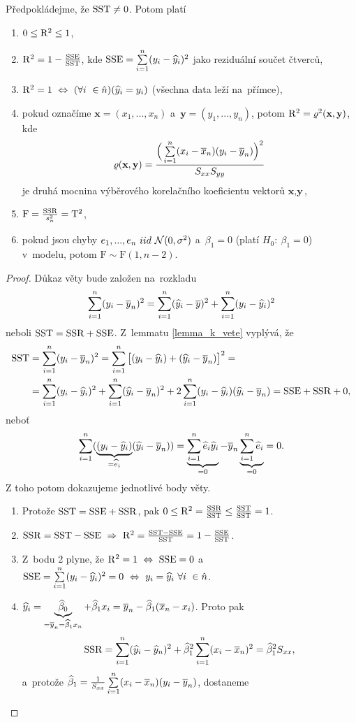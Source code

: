 \begin{theorem}
	Předpokládejme, že $\mathrm{SST}\neq 0$. Potom platí\begin{enumerate}
		\item $0\leq \mathrm{R}^2\leq1$,
		\item $\mathrm{R}^2=1-\frac{\mathrm{SSE}}{\mathrm{SST}}$, kde $\mathrm{SSE}=\sum\limits_{i=1}^{n}(y_i-\widehat{y}_i)^2$ jako reziduální součet čtverců,
		\item $\mathrm{R}^2=1~\Leftrightarrow~(\forall i~\in\hat{n})(\widehat{y}_i=y_i)$ (všechna data leží na~přímce),
		\item pokud označíme $\textbf{x}=(x_1,...,x_n)$ a~$\textbf{y}=(y_1,...,y_n)$, potom $\mathrm{R}^2=\varrho^2(\textbf{x},\textbf{y})$, kde $$\varrho(\textbf{x},\textbf{y})=\frac{\Big(\sum\limits_{i=1}^{n}(x_i-\overline{x}_n)(y_i-\overline{y}_n)\Big)^2}{S_{xx}S_{yy}}$$ je druhá mocnina výběrového korelačního koeficientu vektorů $\textbf{x},\textbf{y}$,
		\item $\mathrm{F}=\frac{\mathrm{SSR}}{s_n^2}=\mathrm{T}^2$,
		\item pokud jsou chyby $e_1,...,e_n~iid~\mathcal{N}(0,\sigma^2)$ a~$\beta_1=0$ (platí $H_0:~\beta_1=0$) v~modelu, potom  $\mathrm{F}\sim\mathrm{F}(1,n-2)$.
	\end{enumerate}
\begin{proof}
	Důkaz věty bude založen na~rozkladu
	$$ \sum\limits_{i=1}^{n} (y_i-\overline{y}_n)^2=\sum\limits_{i=1}^{n}(\widehat{y}_i-\overline{y})^2 + \sum\limits_{i=1}^{n} (y_i-\widehat{y}_i)^2 $$ neboli $\mathrm{SST}=\mathrm{SSR}+\mathrm{SSE}$. Z~lemmatu \ref{lemma_k_vete} vyplývá, že 
	\[
	\begin{split}
	\mathrm{SST}&=\sum\limits_{i=1}^{n} (y_i-\overline{y}_n)^2=\sum\limits_{i=1}^{n}\big[ (y_i-\widehat{y}_i)+(\widehat{y}_i-\overline{y}_n) \big]^2=\\&=\sum\limits_{i=1}^{n}(y_i-\widehat{y}_i)^2+\sum\limits_{i=1}^{n}(\widehat{y}_i-\overline{y}_n)^2+2\sum\limits_{i=1}^{n}(y_i-\widehat{y}_i)(\widehat{y}_i-\overline{y}_n)=\mathrm{SSE}+\mathrm{SSR}+0 ,
	\end{split}
	\]
	neboť $$ \sum\limits_{i=1}^{n}(\underbrace{(y_i-\widehat{y}_i)}_{=\widehat{e}_i}(\widehat{y}_i-\overline{y}_n))=\underbrace{\sum\limits_{i=1}^{n}\widehat{e}_i\widehat{y}_i}_{=0}-\overline{y}_n\underbrace{\sum\limits_{i=1}^{n}\widehat{e}_i}_{=0}=0.$$
	Z toho potom dokazujeme jednotlivé body věty. \begin{enumerate}
		\item Protože $\mathrm{SST}=\mathrm{SSE}+\mathrm{SSR}$, pak $0\leq \mathrm{R}^2=\frac{\mathrm{SSR}}{\mathrm{SST}}\leq \frac{\mathrm{SST}}{\mathrm{SST}}=1$.
		\item $\mathrm{SSR}=\mathrm{SST}-\mathrm{SSE}~\Rightarrow~\mathrm{R}^2=\frac{\mathrm{SST}-\mathrm{SSE}}{\mathrm{SST}}=1-\frac{\mathrm{SSE}}{\mathrm{SST}}$.
		\item Z~bodu 2 plyne, že $\mathrm{R}^2=1~\Leftrightarrow~\mathrm{SSE}=0$ a~$\mathrm{SSE}=\sum\limits_{i=1}^{n}(y_i-\widehat{y}_i)^2=0~\Leftrightarrow~y_i=\widehat{y}_i ~\forall i~\in\hat{n}$.
		\item  $\widehat{y}_i=\underbrace{\widehat{\beta}_0}_{=\overline{y}_n=\widehat{\beta}_1 x_n} + \widehat{\beta}_1 x_i=\overline{y}_n-\widehat{\beta}_1(\overline{x}_n-x_i)$. Proto pak $$ \mathrm{SSR}=\sum\limits_{i=1}^{n}(\widehat{y}_i-\widehat{y}_n)^2+\widehat{\beta}_1^2\sum\limits_{i=1}^{n}(x_i-\overline{x}_n)^2=\widehat{\beta}_1^2 S_{xx},$$ a~protože $\widehat{\beta}_1=\frac{1}{S_{xx}}\sum\limits_{i=1}^{n}(x_i-\overline{x}_n)(y_i-\overline{y}_n)$, dostaneme 

\end{enumerate}
\end{proof}
\end{theorem}
